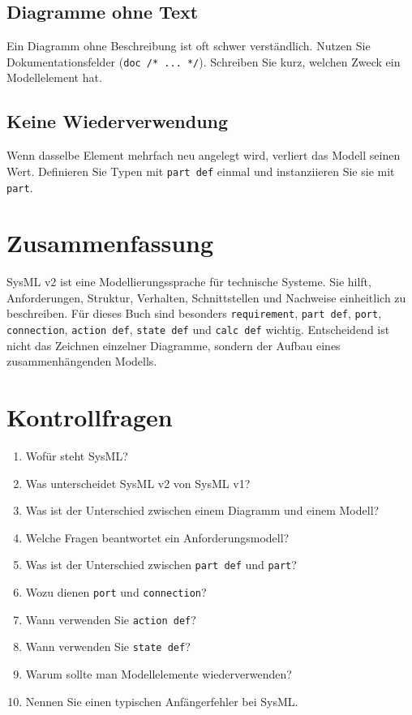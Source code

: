 \subsection{Diagramme ohne Text}
Ein Diagramm ohne Beschreibung ist oft schwer verständlich. Nutzen Sie Dokumentationsfelder (\texttt{doc /* ... */}). Schreiben Sie kurz, welchen Zweck ein Modellelement hat.

\subsection{Keine Wiederverwendung}
Wenn dasselbe Element mehrfach neu angelegt wird, verliert das Modell seinen Wert. Definieren Sie Typen mit \texttt{part def} einmal und instanziieren Sie sie mit \texttt{part}.

\section{Zusammenfassung}
SysML v2 ist eine Modellierungssprache für technische Systeme. Sie hilft, Anforderungen, Struktur, Verhalten, Schnittstellen und Nachweise einheitlich zu beschreiben. Für dieses Buch sind besonders \texttt{requirement}, \texttt{part def}, \texttt{port}, \texttt{connection}, \texttt{action def}, \texttt{state def} und \texttt{calc def} wichtig. Entscheidend ist nicht das Zeichnen einzelner Diagramme, sondern der Aufbau eines zusammenhängenden Modells.

\section{Kontrollfragen}
\begin{enumerate}
    \item Wofür steht SysML?
    \item Was unterscheidet SysML v2 von SysML v1?
    \item Was ist der Unterschied zwischen einem Diagramm und einem Modell?
    \item Welche Fragen beantwortet ein Anforderungsmodell?
    \item Was ist der Unterschied zwischen \texttt{part def} und \texttt{part}?
    \item Wozu dienen \texttt{port} und \texttt{connection}?
    \item Wann verwenden Sie \texttt{action def}?
    \item Wann verwenden Sie \texttt{state def}?
    \item Warum sollte man Modellelemente wiederverwenden?
    \item Nennen Sie einen typischen Anfängerfehler bei SysML.
\end{enumerate}

